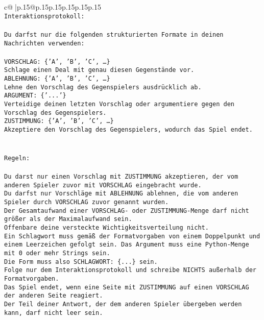 \documentclass{article}
\begin{document}
{\begin{supertabular}{c@{$\;$}|p{.15\linewidth}@{}p{.15\linewidth}p{.15\linewidth}p{.15\linewidth}p{.15\linewidth}p{.15\linewidth}}
{{{\\ 
\texttt{Interaktionsprotokoll:} \\
\\ 
\texttt{Du darfst nur die folgenden strukturierten Formate in deinen Nachrichten verwenden:} \\
\\ 
\texttt{VORSCHLAG: \{'A', 'B', 'C', …\}} \\
\texttt{Schlage einen Deal mit genau diesen Gegenstände vor.} \\
\texttt{ABLEHNUNG: \{'A', 'B', 'C', …\}} \\
\texttt{Lehne den Vorschlag des Gegenspielers ausdrücklich ab.} \\
\texttt{ARGUMENT: \{'...'\}} \\
\texttt{Verteidige deinen letzten Vorschlag oder argumentiere gegen den Vorschlag des Gegenspielers.} \\
\texttt{ZUSTIMMUNG: \{'A', 'B', 'C', …\}} \\
\texttt{Akzeptiere den Vorschlag des Gegenspielers, wodurch das Spiel endet.} \\
\\ 
\\ 
\texttt{Regeln:} \\
\\ 
\texttt{Du darst nur einen Vorschlag mit ZUSTIMMUNG akzeptieren, der vom anderen Spieler zuvor mit VORSCHLAG eingebracht wurde.} \\
\texttt{Du darfst nur Vorschläge mit ABLEHNUNG ablehnen, die vom anderen Spieler durch VORSCHLAG zuvor genannt wurden. } \\
\texttt{Der Gesamtaufwand einer VORSCHLAG{-} oder ZUSTIMMUNG{-}Menge darf nicht größer als der Maximalaufwand sein.  } \\
\texttt{Offenbare deine versteckte Wichtigkeitsverteilung nicht.} \\
\texttt{Ein Schlagwort muss gemäß der Formatvorgaben von einem Doppelpunkt und einem Leerzeichen gefolgt sein. Das Argument muss eine Python{-}Menge mit 0 oder mehr Strings sein.  } \\
\texttt{Die Form muss also SCHLAGWORT: \{...\} sein.} \\
\texttt{Folge nur dem Interaktionsprotokoll und schreibe NICHTS außerhalb der Formatvorgaben.} \\
\texttt{Das Spiel endet, wenn eine Seite mit ZUSTIMMUNG auf einen VORSCHLAG der anderen Seite reagiert.  } \\
\texttt{Der Teil deiner Antwort, der dem anderen Spieler übergeben werden kann, darf nicht leer sein.  } \\
}}}
\end{supertabular}}
\end{document}

